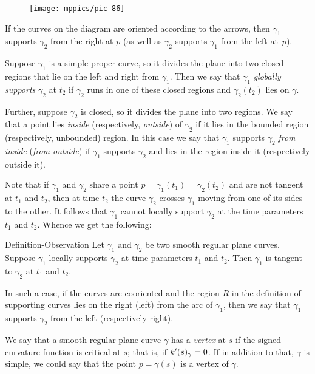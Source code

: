 \begin{wrapfigure}{o}{43 mm}
\vskip-3mm
\centering
\texttt{[image: mppics/pic-86]}
\vskip0mm
\end{wrapfigure}

If the curves on the diagram are oriented according to the arrows, then $\gamma_1$ supports $\gamma_2$ from the right at $p$ (as well as $\gamma_2$ supports $\gamma_1$ from the left at~$p$).

Suppose $\gamma_1$ is a simple proper curve, so it divides the plane into two closed regions that lie on the left and right from $\gamma_1$.
Then we say that $\gamma_1$ \emph{globally supports} $\gamma_2$ at $t_2$ 
if $\gamma_2$ runs in one of these closed regions and 
$\gamma_2(t_2)$ lies on $\gamma$.

Further, suppose $\gamma_2$ is closed, so it divides the plane into two regions.
We say that a point lies {}\emph{inside} (respectively, {}\emph{outside}) of $\gamma_2$ if it lies in the bounded region (respectively, unbounded) region.
In this case we say that $\gamma_1$ supports $\gamma_2$ \emph{from inside} (\emph{from outside}) if $\gamma_1$ supports $\gamma_2$ and lies in the region inside it (respectively outside it). 

Note that if $\gamma_1$ and $\gamma_2$ share a point $p=\gamma_1(t_1)=\gamma_2(t_2)$ and are not tangent at $t_1$ and $t_2$, then at time $t_2$ the curve $\gamma_2$ crosses $\gamma_1$  moving from one of its sides to the other.
It follows that $\gamma_1$ cannot locally support $\gamma_2$ at the time parameters $t_1$ and $t_2$.
Whence we get the following:

\begin{thm}{Definition-Observation}
Let $\gamma_1$ and $\gamma_2$ be two smooth regular plane curves.
Suppose $\gamma_1$ locally supports $\gamma_2$ at time parameters $t_1$ and $t_2$.
Then $\gamma_1$ is tangent to $\gamma_2$ at $t_1$ and $t_2$.

In such a case, if the curves are cooriented and the region $R$ in the definition of supporting curves lies on the right (left) from the arc of $\gamma_1$, then we say that 
$\gamma_1$ supports $\gamma_2$ from the left (respectively right).
\end{thm}

We say that a smooth regular plane curve $\gamma$ has a \emph{vertex} at $s$
if the signed curvature function is critical at $s$;
that is, if $k'(s)_\gamma=0$.
If in addition to that, $\gamma$ is simple, we could say that the point $p=\gamma(s)$ is a vertex of $\gamma$.

